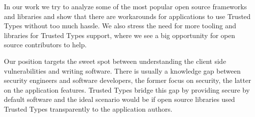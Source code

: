 In our work we try to analyze some of the most popular open source frameworks and libraries and show
that there are workarounds for applications to use Trusted Types without too much hassle. We also
stress the need for more tooling and libraries for Trusted Types support, where we see a big
opportunity for open source contributors to help.

Our position targets the sweet spot between understanding the client side vulnerabilities and
writing software. There is usually a knowledge gap between security engineers and software
developers, the former focus on security, the latter on the application features. Trusted Types
bridge this gap by providing secure by default software and the ideal scenario would be if open
source libraries used Trusted Types transparently to the application authors.
